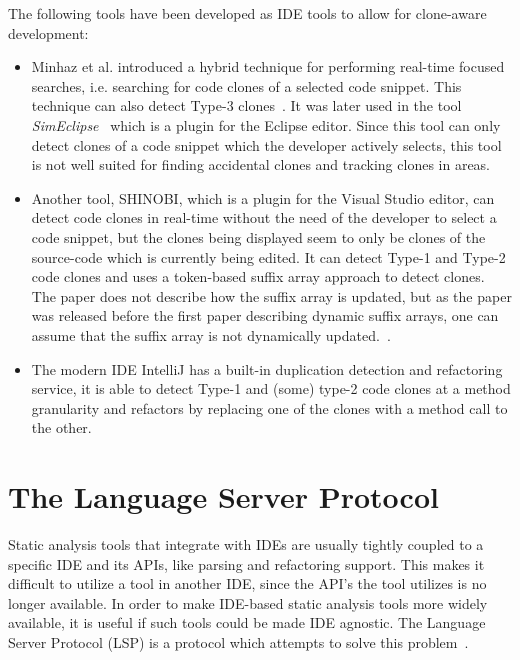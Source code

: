 The following tools have been developed as IDE tools to allow for clone-aware development:

\begin{itemize}

	\item Minhaz et al. introduced a hybrid technique for performing real-time focused
	      searches, i.e. searching for code clones of a selected code snippet. This
	      technique can also detect Type-3 clones~\cite{Zibran_real_time_search}. It was
	      later used in the tool
	      \textit{SimEclipse}~\cite{Udding_Towards_Convenient_Management} which is a plugin
	      for the Eclipse editor. Since this tool can only detect clones of a code snippet
	      which the developer actively selects, this tool is not well suited for finding
	      accidental clones and tracking clones in areas.

    \item Another tool, SHINOBI, which is a plugin for the Visual Studio editor, can
        detect code clones in real-time without the need of the developer to select a code
        snippet, but the clones being displayed seem to only be clones of the source-code
        which is currently being edited. It can detect Type-1 and Type-2 code clones and
        uses a token-based suffix array approach to detect clones. The paper does not
        describe how the suffix array is updated, but as the paper was released before the
        first paper describing dynamic suffix arrays\cite{DynamicExtendedSuffixArrays},
        one can assume that the suffix array is not dynamically updated.~\cite{SHINOBI}.

	\item The modern IDE IntelliJ has a built-in duplication detection and refactoring
	      service, it is able to detect Type-1 and (some) type-2 code clones at a method
	      granularity and refactors by replacing one of the clones with a method call to the
	      other.

\end{itemize}

\section{The Language Server Protocol}

Static analysis tools that integrate with IDEs are usually tightly coupled to a specific
IDE and its APIs, like parsing and refactoring support. This makes it difficult to utilize
a tool in another IDE, since the API's the tool utilizes is no longer available. In order
to make IDE-based static analysis tools more widely available, it is useful if such tools
could be made IDE agnostic. The Language Server Protocol (LSP) is a protocol which
attempts to solve this problem~\cite{lsp}.

